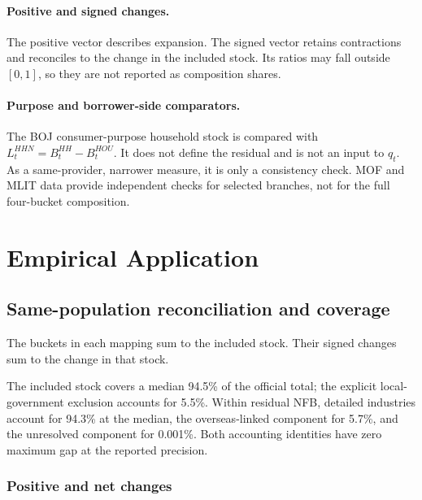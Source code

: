 \documentclass[11pt]{article}
\begin{document}
\paragraph{Positive and signed changes.}
The positive vector describes expansion. The signed vector retains
contractions and reconciles to the change in the included stock. Its ratios
may fall outside \([0,1]\), so they are not reported as composition shares.

\paragraph{Purpose and borrower-side comparators.}
The BOJ consumer-purpose household stock is compared with
\(L_t^{HHN}=B_t^{HH}-B_t^{HOU}\). It does not define the residual and is not an
input to \(q_t\). As a same-provider, narrower measure, it is only a
consistency check. MOF and MLIT data provide independent checks for selected
branches, not for the full four-bucket composition.

\section{Empirical Application}\label{sec:application}

\subsection{Same-population reconciliation and coverage}

The buckets in each mapping sum to the included stock. Their signed changes
sum to the change in that stock.


The included stock covers a median 94.5\% of the official total; the explicit
local-government exclusion accounts for 5.5\%. Within residual NFB, detailed
industries account for 94.3\% at the median, the overseas-linked component for
5.7\%, and the unresolved component for 0.001\%. Both accounting identities
have zero maximum gap at the reported precision.

\subsubsection{Positive and net changes}
\end{document}
